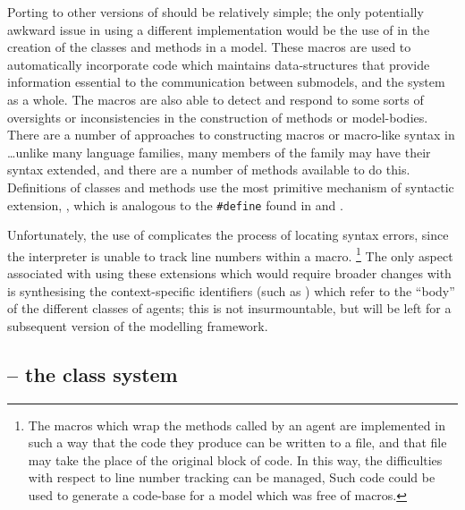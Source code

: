 Porting \ReModel to other versions of \Scheme should be relatively
simple; the only potentially awkward issue in using a
different \Scheme implementation would be the use of \sdefmac in the
creation of the classes and methods in a model.  These macros are used
to automatically incorporate code which maintains data-structures that
provide information essential to the communication between submodels,
and the system as a whole. The macros are also able to detect and
respond to some sorts of oversights or inconsistencies in the
construction of methods or model-bodies.  There are a number of
approaches to constructing macros or macro-like syntax in \Scheme
\ldots unlike many language families, many members of the \Lisp family
may have their syntax extended, and there are a number of methods
available to do this.  Definitions of classes and methods use the most
primitive mechanism of syntactic extension, \sdefmac, which is
analogous to the \texttt{\#define} found in \CC and \Cpp.

Unfortunately, the use of \sdefmac complicates the process of locating
syntax errors, since the interpreter is unable to track line numbers
within a macro. \footnote{The macros which wrap the methods called by
an agent are implemented in such a way that the code they produce can
be written to a file, and that file may take the place of the original
block of code.  In this way, the difficulties with respect to line
number tracking can be managed, Such code could be used to generate a
code-base for a model which was free of macros.}  The only aspect
associated with using these extensions which would require broader
changes with \sdefsyntax is synthesising the context-specific
identifiers (such as ) which refer to the
``body'' of the different classes of agents; this is not
insurmountable, but will be left for a subsequent version of the
modelling framework.

\subsection{\SCLOS -- the class system}

